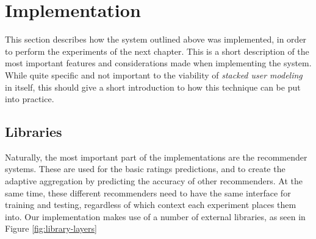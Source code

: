 
\chapter{Implementation}
\label{appendix:implementation}


This section describes how the system outlined above was implemented,
in order to perform the experiments of the next chapter.
This is a short description of the most important features and considerations
made when implementing the system.
While quite specific and not important to the viability of 
\emph{stacked user modeling} in itself,
this should give a short introduction to how this technique can be put into practice.

\section{Libraries}

\begin{figure}[t]
  \begin{center}
  \end{center}
\end{figure}

Naturally, the most important part of the implementations are the recommender systems.
These are used for the basic ratings predictions, and to 
create the adaptive aggregation by predicting the accuracy of other recommenders.
At the same time, these different recommenders need to have the same
interface for training and testing, regardless of which context
each experiment places them into.
Our implementation makes use of a number of external libraries,
as seen in Figure \ref{fig:library-layers}

